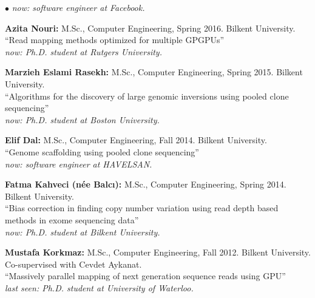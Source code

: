 \documentclass[margin,line]{res}
\newenvironment{list2}{
  \begin{list}{$\bullet$}{%
      \setlength{\itemsep}{0.1cm}
      \setlength{\parsep}{0in} \setlength{\parskip}{0in}
      \setlength{\topsep}{0in} \setlength{\partopsep}{0in} 
      \setlength{\leftmargin}{0.2in}}}{\end{list}}
\begin{document}
\begin{resume}
\begin{list2}
  {\it now: software engineer at Facebook.}
\item
  {\bf Azita Nouri:} M.Sc., Computer Engineering, Spring 2016.
  Bilkent University.\\
  ``Read mapping methods optimized for multiple GPGPUs''\\
  {\it now: Ph.D. student at Rutgers University.}
\item
  {\bf Marzieh Eslami Rasekh:} M.Sc., Computer Engineering, Spring 2015.
  Bilkent University.\\
  ``Algorithms for the discovery of large genomic inversions using pooled clone sequencing''\\
  {\it now: Ph.D. student at Boston University.}
\item
  {\bf Elif Dal:} M.Sc., Computer Engineering, Fall 2014.
  Bilkent University.\\
  ``Genome scaffolding using pooled clone sequencing''\\
  {\it now: software engineer at HAVELSAN.}
\item
  {\bf Fatma Kahveci (n\'{e}e Balc{\i}):} M.Sc., Computer Engineering, Spring 2014.
  Bilkent University.\\
  ``Bias correction in finding copy number variation using read depth based methods in exome sequencing data''\\
  {\it now: Ph.D. student at Bilkent University.}
\item
 {\bf Mustafa Korkmaz:} M.Sc., Computer Engineering, Fall 2012.
  Bilkent University. \\ Co-supervised with Cevdet Aykanat.\\
  ``Massively parallel mapping of next generation sequence reads using GPU''\\
  {\it last seen: Ph.D. student at University of Waterloo.}
\end{list2}
\vspace*{-.4cm}

\end{resume}
\end{document}
